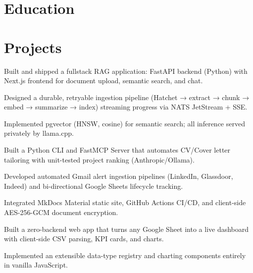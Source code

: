 \documentclass[10pt,a4paper]{resume}
\begin{document}
\section{Education}

\vspace{2pt}

\section{Projects}

\bullets
  \item Built and shipped a fullstack RAG application: FastAPI backend (Python) with Next.js frontend for document upload, semantic search, and chat.
  \item Designed a durable, retryable ingestion pipeline (Hatchet → extract → chunk → embed → summarize → index) streaming progress via NATS JetStream + SSE.
  \item Implemented pgvector (HNSW, cosine) for semantic search; all inference served privately by llama.cpp.
\bulletsend
\vspace{1.0pt}
\bullets
  \item Built a Python CLI and FastMCP Server that automates CV/Cover letter tailoring with unit-tested project ranking (Anthropic/Ollama).
  \item Developed automated Gmail alert ingestion pipelines (LinkedIn, Glassdoor, Indeed) and bi-directional Google Sheets lifecycle tracking.
  \item Integrated MkDocs Material static site, GitHub Actions CI/CD, and client-side AES-256-GCM document encryption.
\bulletsend
\vspace{1.0pt}
\bullets
  \item Built a zero-backend web app that turns any Google Sheet into a live dashboard with client-side CSV parsing, KPI cards, and charts.
  \item Implemented an extensible data-type registry and charting components entirely in vanilla JavaScript.
\bulletsend
\end{document}
